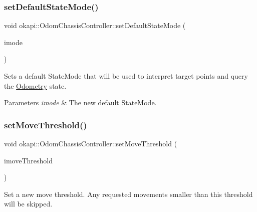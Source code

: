 \mbox{\label{classokapi_1_1OdomChassisController_a79152ae9fb43abbb51179f7bd7ce5fde}} 
\subsubsection{\texorpdfstring{setDefaultStateMode()}{setDefaultStateMode()}}
{\footnotesize\ttfamily void okapi\+::\+Odom\+Chassis\+Controller\+::set\+Default\+State\+Mode (\begin{DoxyParamCaption}\item[{const \mbox{\hyperlink{namespaceokapi_af37fbd761bd859a00ff4dd4a87dd8c07}{State\+Mode}} \&}]{imode }\end{DoxyParamCaption})}

Sets a default State\+Mode that will be used to interpret target points and query the \mbox{\hyperlink{classokapi_1_1Odometry}{Odometry}} state.


\begin{DoxyParams}{Parameters}
{\em imode} & The new default State\+Mode. \\
\hline
\end{DoxyParams}
\mbox{\label{classokapi_1_1OdomChassisController_adf98b0e1b91d1f72cce5b76b992257a0}} 
\subsubsection{\texorpdfstring{setMoveThreshold()}{setMoveThreshold()}}
{\footnotesize\ttfamily void okapi\+::\+Odom\+Chassis\+Controller\+::set\+Move\+Threshold (\begin{DoxyParamCaption}\item[{const Q\+Length \&}]{imove\+Threshold }\end{DoxyParamCaption})\hspace{0.3cm}{\ttfamily [virtual]}}

Set a new move threshold. Any requested movements smaller than this threshold will be skipped.


